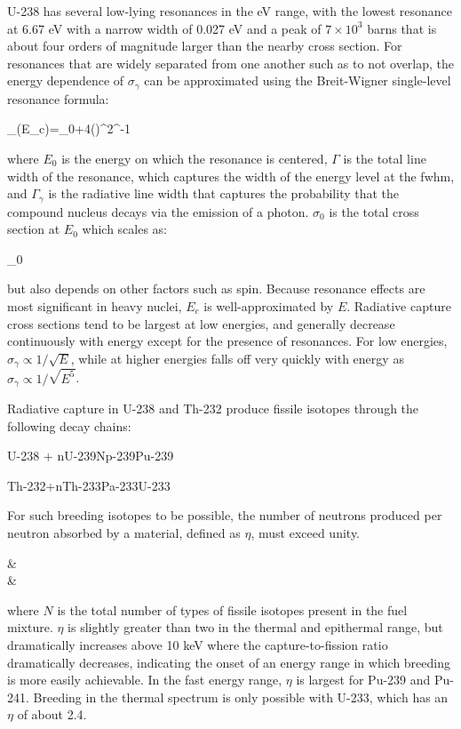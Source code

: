U-238 has several low-lying resonances in the eV range, with the lowest resonance at 6.67 eV with a narrow width of 0.027 eV and a peak of \(7\times10^3\) barns that is about four orders of magnitude larger than the nearby cross section. For resonances that are widely separated from one another such as to not overlap, the energy dependence of \(\sigma_\gamma\) can be approximated using the Breit-Wigner single-level resonance formula:

\beq
\label{eq:BW}
\sigma_\gamma(E_c)=\sigma_0\frac{\Gamma_\gamma}{\Gamma}\left{}+4\left(\right)^2\right\rbrack^{-1}
\eeq

where \(E_0\) is the energy on which the resonance is centered, \(\Gamma\) is the total line width of the resonance, which captures the width of the energy level at the \gls{fwhm}, and \(\Gamma_\gamma\) is the radiative line width that captures the probability that the compound nucleus decays via the emission of a photon. \(\sigma_0\) is the total cross section at \(E_0\) which scales as:

\beq
\sigma_0\propto{}
\eeq

but also depends on other factors such as spin. Because resonance effects are most significant in heavy nuclei, \(E_c\) is well-approximated by \(E\). Radiative capture cross sections tend to be largest at low energies, and generally decrease continuously with energy except for the presence of resonances. For low energies, \(\sigma_\gamma\propto1/\sqrt{E}\), while at higher energies falls off very quickly with energy as \(\sigma_\gamma\propto1/\sqrt{E^5}\).

Radiative capture in U-238 and Th-232 produce fissile isotopes through the following decay chains:

\beq
U-238 + n\rightarrow U-239\rightarrow Np-239\rightarrow Pu-239
\eeq

\beq
Th-232+n\rightarrow Th-233\rightarrow Pa-233\rightarrow U-233
\eeq

For such breeding isotopes to be possible, the number of neutrons produced per neutron absorbed by a material, defined as \(\eta\), must exceed unity. 

\beqa
\label{eq:Eta2Def}
\eta\equiv&\\
\equiv&
\eeqa

where \(N\) is the total number of types of fissile isotopes present in the fuel mixture. \(\eta\) is slightly greater than two in the thermal and epithermal range, but dramatically increases above 10 keV where the capture-to-fission ratio dramatically decreases, indicating the onset of an energy range in which breeding is more easily achievable. In the fast energy range, \(\eta\) is largest for Pu-239 and Pu-241. Breeding in the thermal spectrum is only possible with U-233, which has an \(\eta\) of about 2.4. 

